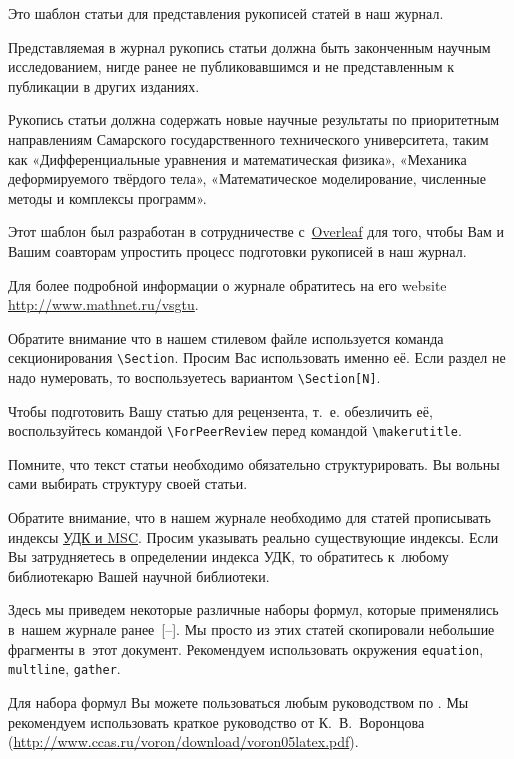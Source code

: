 \makerutitle

\newpage

Это шаблон статьи для представления рукописей статей в наш журнал.

Представляемая в журнал рукопись статьи должна быть законченным научным исследованием, нигде ранее не публиковавшимся и не представленным к публикации в других изданиях.

Рукопись статьи должна содержать новые научные результаты по приоритетным направлениям Самарского государственного технического университета, таким как «Дифференциальные уравнения и математическая физика», «Механика деформируемого твёрдого тела», «Математическое моделирование, численные методы и комплексы программ». 

Этот шаблон был разработан в сотрудничестве с~\href{https://www.overleaf.com/about}{Overleaf} для того, чтобы Вам и Вашим соавторам упростить процесс подготовки рукописей в наш журнал.

Для более подробной информации о журнале обратитесь на его website \url{http://www.mathnet.ru/vsgtu}.

Обратите внимание что в нашем стилевом файле используется команда секционирования \verb"\Section". 
Просим Вас  использовать именно её. 
Если раздел не надо нумеровать, то воспользуетесь вариантом \verb"\Section[N]".

Чтобы подготовить Вашу статью для рецензента, т.~е. обезличить её, воспользуйтесь командой \verb"\ForPeerReview" перед командой 
\verb"\makerutitle".

Помните, что текст статьи  необходимо обязательно структурировать. 
Вы вольны сами выбирать структуру своей статьи.

Обратите внимание, что в нашем журнале необходимо для статей прописывать индексы \href{http://www.mathnet.ru/classifications.phtml?wshow=classifications&option_lang=rus}{УДК и MSC}. 
Просим указывать реально существующие индексы.
Если Вы затрудняетесь в определении индекса УДК, то обратитесь к~любому библиотекарю Вашей научной библиотеки.

Здесь мы приведем некоторые различные наборы формул, которые применялись в~нашем журнале ранее~[--].  
Мы просто из этих статей скопировали небольшие фрагменты в~этот документ.
Рекомендуем использовать окружения {\tt equation}, {\tt multline}, {\tt gather}.


Для набора формул Вы можете пользоваться любым руководством по \LaTeXe.
Мы рекомендуем использовать краткое руководство от К.~В.~Воронцова (\url{http://www.ccas.ru/voron/download/voron05latex.pdf}).

